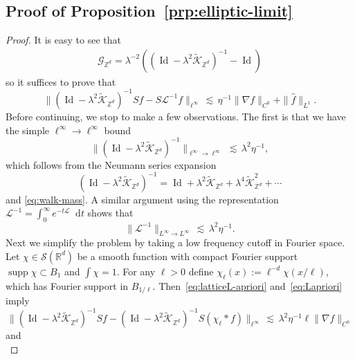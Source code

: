 \documentclass[11pt]{amsart}
\def\Real{{\mathbb R}}
\newcommand{\diff}{\mathop{}\!\mathrm{d}}
\newcommand{\Id}{{\operatorname*{Id}}}
\newcommand{\Ft}[1]{{\widehat{#1}}}
\newcommand{\supp}{\operatorname*{supp}}
\def\lsim{{\,\lesssim\,}}
\newcommand{\mcal}[1]{{\mathcal{#1}}}
\numberwithin{equation}{section}
\numberwithin{theorem}{section}
\begin{document}
\subsection{Proof of Proposition~\ref{prp:elliptic-limit}}

\begin{proof}
It is easy to see that
\begin{align*}
\mathcal{G}_{\mathbb{Z}^d}= \lambda^{-2}\left( (\Id-\lambda^{2}\tilde{\mcal{K}}_{\mathbb{Z}^d})^{-1}-\Id \right)
\end{align*}
so it suffices to prove that
\begin{equation}
\label{eq:actual-bd}
\|(\Id-\lambda^{2}\tilde{\mathcal{K}}_{\mathbb{Z}^d})^{-1} S f - S\mathcal{L}^{-1} f\|_{\ell^\infty} \lsim \eta^{-1} \|\nabla f\|_{C^0} + \|\Ft{f}\|_{L^1}.
\end{equation}
Before continuing, we stop to make a few observations.  The first is that we have the simple $\ell^\infty\to\ell^\infty$ bound
\begin{equation}
\label{eq:latticeL-apriori}
\|(\Id-\lambda^{2}\tilde{\mcal{K}}_{\mathbb{Z}^d})^{-1}\|_{\ell^\infty\to\ell^\infty} \lsim \lambda^2\eta^{-1},
\end{equation}
which follows from the Neumann series expansion
\[
(\Id-\lambda^{2}\tilde{\mathcal{K}}_{\mathbb{Z}^d})^{-1} = \Id + \lambda^2\mcal{\tilde{K}}_{\mathbb{Z}^d} + \lambda^4 \mcal{\tilde{K}}_{\mathbb{Z}^d}^2 + \cdots
\]
and \eqref{eq:walk-mass}.
A similar argument using the representation $\mcal{L}^{-1} = \int_0^\infty e^{-t\mcal{L}} \diff t$ shows that
\begin{equation}
\label{eq:Lapriori}
\|\mcal{L}^{-1}\|_{L^\infty\to L^\infty} \lsim \lambda^2\eta^{-1}.
\end{equation}
Next we simplify the problem by taking a low frequency cutoff in Fourier space.
Let $\chi \in \mcal{S}(\Real^d)$ be a smooth function with compact Fourier support $\supp\Ft{\chi}\subset B_1$ and $\int \chi = 1$.  For any $\ell>0$ define $\chi_\ell(x) := \ell^{-d} \chi(x/\ell)$, which has Fourier support in $B_{1/\ell}$.
Then~\eqref{eq:latticeL-apriori} and~\eqref{eq:Lapriori} imply
\begin{equation}
\label{eq:smoothingerr1}
\|(\Id-\lambda^{2}\tilde{\mcal{K}}_{\mathbb{Z}^d})^{-1} S f - (\Id-\lambda^{2}\tilde{\mcal{K}}_{\mathbb{Z}^d})^{-1} S(\chi_\ell \ast f)\|_{\ell^\infty} \lsim \lambda^2\eta^{-1} \ell \|\nabla f\|_{C^0}
\end{equation}
and
\begin{equation}
\label{eq:smoothingerr2}

\end{equation}
\end{proof}
\end{document}
